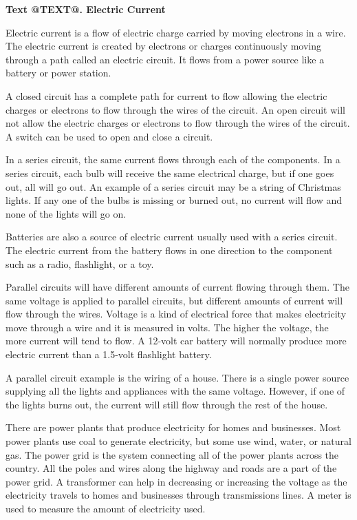{\bf Text @TEXT@. Electric Current}

Electric current is a flow of electric charge carried by moving 
electrons in a wire. The electric current is created by
electrons or charges continuously moving through a path called 
an electric circuit. 
It flows from a power source like a battery or power station.

A closed circuit has a complete path for current to flow allowing 
the electric charges or electrons to flow through the
wires of the circuit. An open circuit will not allow the electric 
charges or electrons to flow through the wires of the
circuit. A switch can be used to open and close a circuit.

In a series circuit, the same current flows through each of the 
components. In a series circuit, each bulb will receive
the same electrical charge, but if one goes out, all will go out. An 
example of a series circuit may be a string of
Christmas lights. If any one of the bulbs is missing or burned out, 
no current will flow and none of the lights will go on.

Batteries are also a source of electric current usually used with a 
series circuit. The electric current from the
battery flows in one direction to the component such as a radio, 
flashlight, or a toy.

Parallel circuits will have different amounts of current flowing 
through them. The same voltage is applied to parallel
circuits, but different amounts of current will flow through the 
wires. Voltage is a kind of electrical force that
makes electricity move through a wire and it is measured in 
volts. The higher the voltage, the more current will
tend to flow. A 12-volt car battery will normally produce more 
electric current than a 1.5-volt flashlight battery.

A parallel circuit example is the wiring of a house. There is a 
single power source supplying all the lights and
appliances with the same voltage. However, if one of the lights 
burns out, the current will still flow through the rest
of the house.

There are power plants that produce electricity for homes and 
businesses. Most power plants use coal to generate
electricity, but some use wind, water, or natural gas. The power 
grid is the system connecting all of the power plants
across the country. All the poles and wires along the highway and 
roads are a part of the power grid. A transformer can
help in decreasing or increasing the voltage as the electricity 
travels to homes and businesses through transmissions
lines. A meter is used to measure the amount of electricity used.

